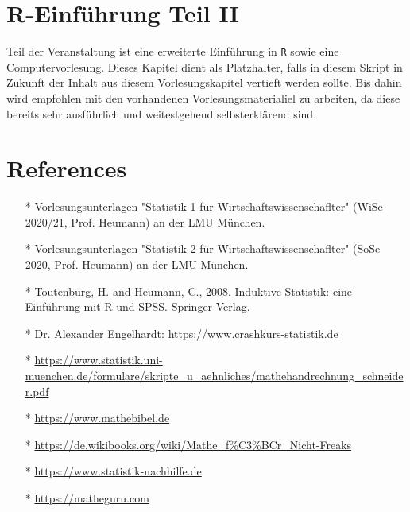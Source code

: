 \documentclass[a4paper]{article}
\begin{document}
\clearpage


\section{R-Einführung Teil II}

Teil der Veranstaltung ist eine erweiterte Einführung in \texttt{R} sowie eine Computervorlesung. Dieses Kapitel dient als Platzhalter, falls in diesem Skript in Zukunft der Inhalt aus diesem Vorlesungskapitel vertieft werden sollte. Bis dahin wird empfohlen mit den vorhandenen Vorlesungsmaterialiel zu arbeiten, da diese bereits sehr ausführlich und weitestgehend selbsterklärend sind.


\clearpage


\section*{References}

\begin{itemize}
    \item[*] Vorlesungsunterlagen "Statistik 1 für Wirtschaftswissenschaflter" (WiSe 2020/21, Prof. Heumann) an der LMU München.
    \item[*] Vorlesungsunterlagen "Statistik 2 für Wirtschaftswissenschaflter" (SoSe 2020, Prof. Heumann) an der LMU München.
    \item[*] Toutenburg, H. and Heumann, C., 2008. Induktive Statistik: eine Einführung mit R und SPSS. Springer-Verlag.
    \item[*] Dr. Alexander Engelhardt: \url{https://www.crashkurs-statistik.de}
    \item[*] \url{https://www.statistik.uni-muenchen.de/formulare/skripte_u_aehnliches/mathehandrechnung_schneider.pdf}
    \item[*] \url{https://www.mathebibel.de}
    \item[*] \url{https://de.wikibooks.org/wiki/Mathe_f\%C3\%BCr_Nicht-Freaks}
    \item[*] \url{https://www.statistik-nachhilfe.de}
    \item[*] \url{https://matheguru.com}
\end{itemize}
\end{document}
